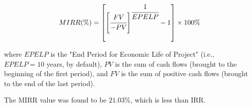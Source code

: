 \begin{enumerate}[label=\textbf{Step \arabic{enumi}}:,ref=Step \arabic{enumi}]
	\begin{equation}
		MIRR(\%) = \left[ \left[ \cfrac{FV}{-PV} \right]^{\cfrac{1}{EPELP}} -1 \right] \times 100\%
		\label{EQ:MIRR}
	\end{equation}

	where $EPELP$ is the "End Period for Economic Life of Project" (i.e., $EPELP=10$ years, by default), $PV$ is the sum of cash flows (brought to the beginning of the first period), and $FV$ is the sum of positive cash flows (brought to the end of the last period).
	
	The MIRR value was found to be $21.03\%$, which is less than IRR.

\end{enumerate}
	
	\clearpage
	
	